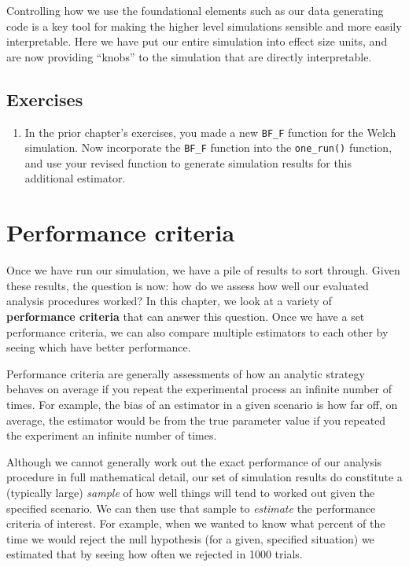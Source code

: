 \documentclass[
]{book}
\providecommand{\tightlist}{%
  \setlength{\itemsep}{0pt}\setlength{\parskip}{0pt}}
\begin{document}
Controlling how we use the foundational elements such as our data generating code is a key tool for making the higher level simulations sensible and more easily interpretable.
Here we have put our entire simulation into effect size units, and are now providing ``knobs'' to the simulation that are directly interpretable.

\section{Exercises}\label{exercises-4}

\begin{enumerate}
\def\labelenumi{\arabic{enumi}.}
\tightlist
\item
  In the prior chapter's exercises, you made a new \texttt{BF\_F} function for the Welch simulation. Now incorporate the \texttt{BF\_F} function into the \texttt{one\_run()} function, and use your revised function to generate simulation results for this additional estimator.
\end{enumerate}

\chapter{Performance criteria}\label{performance-criteria}

Once we have run our simulation, we have a pile of results to sort through.
Given these results, the question is now: how do we assess how well our evaluated analysis procedures worked? In this chapter, we look at a variety of \textbf{performance criteria} that can answer this question. Once we have a set performance criteria, we can also compare multiple estimators to each other by seeing which have better performance.

Performance criteria are generally assessments of how an analytic strategy behaves on average if you repeat the experimental process an infinite number of times.
For example, the bias of an estimator in a given scenario is how far off, on average, the estimator would be from the true parameter value if you repeated the experiment an infinite number of times.

Although we cannot generally work out the exact performance of our analysis procedure in full mathematical detail, our set of simulation results do constitute a (typically large) \emph{sample} of how well things will tend to worked out given the specified scenario.
We can then use that sample to \emph{estimate} the performance criteria of interest.
For example, when we wanted to know what percent of the time we would reject the null hypothesis (for a given, specified situation) we estimated that by seeing how often we rejected in 1000 trials.
\end{document}
